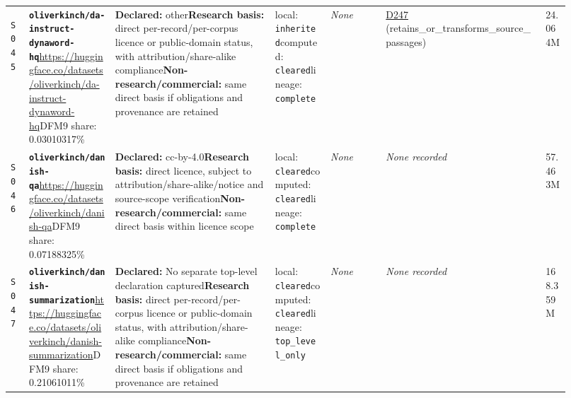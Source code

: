 \documentclass[9pt,a4paper]{article}
\newcommand{\srcid}[1]{\hypertarget{src:#1}{\texttt{#1}}}
\begin{document}
\begin{landscape}
\begin{longtable}{@{}L{0.03\linewidth}L{0.14\linewidth}L{0.26\linewidth}L{0.09\linewidth}L{0.09\linewidth}L{0.265\linewidth}L{0.045\linewidth}@{}}
\srcid{S045} & \textbf{\nolinkurl{oliverkinch/da-instruct-dynaword-hq}}\newline \url{https://huggingface.co/datasets/oliverkinch/da-instruct-dynaword-hq}\newline DFM9 share: 0.03010317\% & \textbf{Declared:} other\newline \textbf{Research basis:} direct per-record/per-corpus licence or public-domain status, with attribution/share-alike compliance\newline \textbf{Non-research/commercial:} same direct basis if obligations and provenance are retained & local: \texttt{inherited}\newline computed: \texttt{cleared}\newline lineage: \texttt{complete} & \textit{None} & \hyperlink{dep:D247}{D247} (retains\_or\_transforms\_source\_passages) & 24.064M \\
\srcid{S046} & \textbf{\nolinkurl{oliverkinch/danish-qa}}\newline \url{https://huggingface.co/datasets/oliverkinch/danish-qa}\newline DFM9 share: 0.07188325\% & \textbf{Declared:} cc-by-4.0\newline \textbf{Research basis:} direct licence, subject to attribution/share-alike/notice and source-scope verification\newline \textbf{Non-research/commercial:} same direct basis within licence scope & local: \texttt{cleared}\newline computed: \texttt{cleared}\newline lineage: \texttt{complete} & \textit{None} & \textit{None recorded} & 57.463M \\
\srcid{S047} & \textbf{\nolinkurl{oliverkinch/danish-summarization}}\newline \url{https://huggingface.co/datasets/oliverkinch/danish-summarization}\newline DFM9 share: 0.21061011\% & \textbf{Declared:} No separate top-level declaration captured\newline \textbf{Research basis:} direct per-record/per-corpus licence or public-domain status, with attribution/share-alike compliance\newline \textbf{Non-research/commercial:} same direct basis if obligations and provenance are retained & local: \texttt{cleared}\newline computed: \texttt{cleared}\newline lineage: \texttt{top\_level\_only} & \textit{None} & \textit{None recorded} & 168.359M \\

\end{longtable}
\end{landscape}
\end{document}
